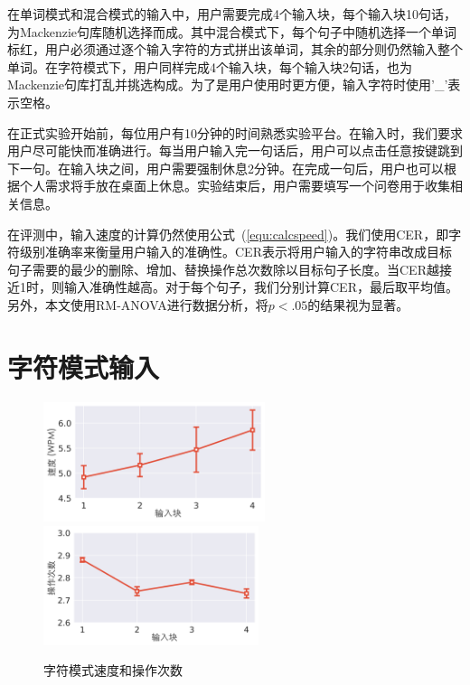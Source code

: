 在单词模式和混合模式的输入中，用户需要完成4个输入块，每个输入块10句话，为Mackenzie句库随机选择而成\cite{mackenzie2003phrase}。其中混合模式下，每个句子中随机选择一个单词标红，用户必须通过逐个输入字符的方式拼出该单词，其余的部分则仍然输入整个单词。在字符模式下，用户同样完成4个输入块，每个输入块2句话，也为Mackenzie句库\cite{mackenzie2003phrase}打乱并挑选构成。为了是用户使用时更方便，输入字符时使用'\_'表示空格。

在正式实验开始前，每位用户有10分钟的时间熟悉实验平台。在输入时，我们要求用户尽可能快而准确进行。每当用户输入完一句话后，用户可以点击任意按键跳到下一句。在输入块之间，用户需要强制休息2分钟。在完成一句后，用户也可以根据个人需求将手放在桌面上休息。实验结束后，用户需要填写一个问卷用于收集相关信息。

在评测中，输入速度的计算仍然使用公式~(\ref{equ:calcspeed})。我们使用CER\cite{cer}，即字符级别准确率来衡量用户输入的准确性。CER表示将用户输入的字符串改成目标句子需要的最少的删除、增加、替换操作总次数除以目标句子长度。当CER越接近1时，则输入准确性越高。对于每个句子，我们分别计算CER，最后取平均值。另外，本文使用RM-ANOVA进行数据分析，将$p<.05$的结果视为显著。

\section{字符模式输入}

\begin{figure}[h]
  \centering%
    {\includegraphics[height=3.5cm]{figures/charspeed.png}}%
  \hspace{4em}%
      {\includegraphics[height=3.5cm]{figures/ops.png}}
  \caption{字符模式速度和操作次数}
  \label{fig:charres}
\end{figure}

